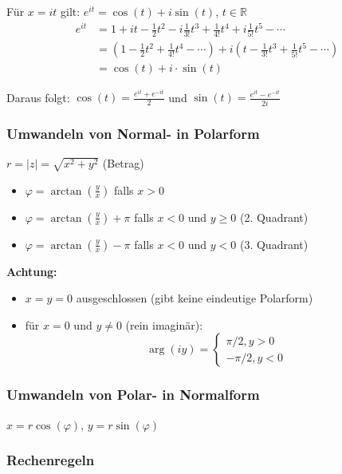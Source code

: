 Für $x=it$ gilt: $e^{it}=\cos(t)+i \sin(t)$, $t\in \mathbb{R}$ 
\begin{align*}
e^{it} &= 1 + it - \frac{1}{2}t^2 - i\frac{1}{3!}t^3 + \frac{1}{4!}t^4 + i\frac{1}{5!}t^5 - \cdots \\[6pt]
       &= \left(1 - \frac{1}{2}t^2 + \frac{1}{4!}t^4 - \cdots\right) + i\left(t - \frac{1}{3!}t^3 + \frac{1}{5!}t^5 - \cdots\right) \\[6pt]
       &= \cos(t) + i \cdot \sin(t)
\end{align*}

Daraus folgt: $\cos(t)=\frac{e^{it}+e^{-it}}{2}$ und $\sin(t)=\frac{e^{it}-e^{-it}}{2i}$

\subsubsection{Umwandeln von Normal- in Polarform}

$r = |z| = \sqrt{x^2 + y ^2}$ (Betrag)
\begin{itemize}
    \item $\varphi = \arctan(\frac{y}{x})$ falls $x > 0$
    \item $\varphi = \arctan(\frac{y}{x}) + \pi$ falls $x < 0$ und $y \geq 0$ (2. Quadrant)
    \item $\varphi = \arctan(\frac{y}{x}) - \pi$ falls $x < 0$ und $y < 0$ (3. Quadrant)

\end{itemize}

\textbf{Achtung:} 
\begin{itemize}
    \item $x=y=0$ ausgeschlossen (gibt keine eindeutige Polarform)
    \item für $x=0$ und $y \neq 0$ (rein imaginär): $$\arg(iy) = \begin{cases}
        \pi / 2, y>0 \\
        - \pi / 2, y<0
    \end{cases}$$
\end{itemize}

\subsubsection{Umwandeln von Polar- in Normalform}

$x=r \cos(\varphi)$, $y = r \sin(\varphi)$

\subsubsection{Rechenregeln}

